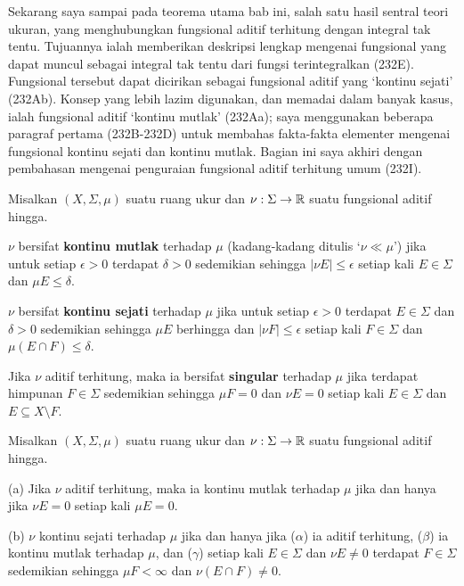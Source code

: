 
\def\chaptername{Teorema Radon-Nikod\'ym}
\def\sectionname{Teorema Radon-Nikod\'ym}


Sekarang saya sampai pada teorema utama bab ini, salah satu hasil sentral
teori ukuran, yang menghubungkan fungsional aditif terhitung dengan integral
tak tentu. Tujuannya ialah memberikan deskripsi lengkap mengenai fungsional
yang dapat muncul sebagai integral tak tentu dari fungsi terintegralkan
(232E). Fungsional tersebut dapat dicirikan sebagai fungsional aditif yang
`kontinu sejati' (232Ab). Konsep yang lebih lazim digunakan, dan memadai
dalam banyak kasus, ialah fungsional aditif `kontinu mutlak' (232Aa); saya
menggunakan beberapa paragraf pertama (232B-232D) untuk membahas fakta-fakta
elementer mengenai fungsional kontinu sejati dan kontinu mutlak. Bagian ini
saya akhiri dengan pembahasan mengenai penguraian fungsional aditif terhitung
umum (232I).

 Misalkan $(X,\Sigma,\mu)$ suatu
ruang ukur dan $\nu:\Sigma\to\Bbb R$ suatu fungsional aditif hingga.

 $\nu$ bersifat {\bf kontinu mutlak} terhadap
$\mu$ (kadang-kadang ditulis `$\nu\ll\mu$') jika untuk setiap
$\epsilon>0$ terdapat $\delta>0$ sedemikian sehingga
$|\nu E|\le\epsilon$ setiap kali $E\in\Sigma$ dan $\mu E\le\delta$.


 $\nu$ bersifat {\bf kontinu sejati} terhadap
$\mu$ jika untuk setiap $\epsilon>0$ terdapat $E\in\Sigma$ dan
$\delta>0$ sedemikian sehingga $\mu E$ berhingga dan
$|\nu F|\le\epsilon$ setiap kali $F\in\Sigma$ dan
$\mu(E\cap F)\le\delta$.


 Jika $\nu$ aditif terhitung, maka ia bersifat
{\bf singular} terhadap $\mu$ jika terdapat himpunan $F\in\Sigma$
sedemikian sehingga $\mu F=0$ dan $\nu E=0$ setiap kali $E\in\Sigma$
dan $E\subseteq X\setminus F$.


 Misalkan $(X,\Sigma,\mu)$ suatu ruang ukur dan
$\nu:\Sigma\to\Bbb R$ suatu fungsional aditif hingga.

(a) Jika $\nu$ aditif terhitung, maka ia kontinu mutlak terhadap
$\mu$ jika dan hanya jika $\nu E=0$ setiap kali $\mu E=0$.

(b) $\nu$ kontinu sejati terhadap $\mu$ jika dan hanya jika
($\alpha$) ia aditif terhitung, ($\beta$) ia kontinu mutlak terhadap
$\mu$, dan ($\gamma$) setiap kali $E\in\Sigma$ dan $\nu E\ne 0$ terdapat
$F\in\Sigma$ sedemikian sehingga $\mu F<\infty$ dan
$\nu(E\cap F)\ne 0$.

